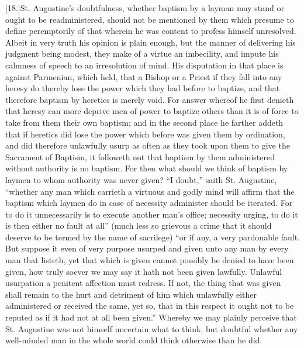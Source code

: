 [18.]St. Augustine’s doubtfulness, whether baptism by a layman may stand or ought to be readministered, should not be mentioned by them which presume to define peremptorily of that wherein he was content to profess himself unresolved. Albeit in very truth his opinion is plain enough, but the manner of delivering his judgment being modest, they make of a virtue an imbecility, and impute his calmness of speech to an irresolution of mind. His disputation in that place is against Parmenian, which held, that a Bishop or a Priest if they fall into any heresy do thereby lose the power which they had before to baptize, and that therefore baptism by heretics is merely void. For answer whereof he first denieth that heresy can more deprive men of power to baptize others than it is of force to take from them their own baptism; and in the second place he farther addeth that if heretics did lose the power which before was given them by ordination, and did therefore unlawfully usurp as often as they took upon them to give the Sacrament of Baptism, it followeth not that baptism by them administered without authority is no baptism. For then what should we think of baptism by laymen to whom authority was never given? “I doubt,” saith St. Augustine, “whether  any man which carrieth a virtuous and godly mind will affirm that the baptism which laymen do in case of necessity administer should be iterated.
 For to do it unnecessarily is to execute another man’s office; necessity urging, to do it is then either no fault at all” (much less so grievous a crime that it should deserve to be termed by the name of sacrilege) “or if any, a very pardonable fault. But suppose it even of very purpose usurped and given unto any man by every man that listeth, yet that which is given cannot possibly be denied to have been given, how truly soever we may say it hath not been given lawfully. Unlawful usurpation a penitent affection must redress. If not, the thing that was given shall remain to the hurt and detriment of him which unlawfully either administered or received the same, yet so, that in this respect it ought not to be reputed as if it had not at all been given.” Whereby we may plainly perceive that St. Augustine was not himself uncertain what to think, but doubtful whether any well-minded man in the whole world could think otherwise than he did.

